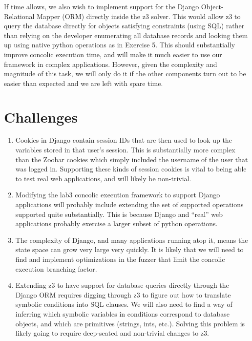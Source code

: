 \documentclass[a4page]{scrartcl}
\begin{document}
If time allows, we also wish to implement support for the Django
Object-Relational Mapper (ORM) directly inside the z3 solver. This would allow
z3 to query the database directly for objects satisfying constraints (using
SQL) rather than relying on the developer enumerating all database records and
looking them up using native python operations as in Exercise 5. This should
substantially improve concolic execution time, and will make it much easier to
use our framework in complex applications. However, given the complexity and
magnitude of this task, we will only do it if the other components turn out to
be easier than expected and we are left with spare time.

\section{Challenges}
\begin{enumerate}
	\item Cookies in Django contain session IDs that are then used to look
		up the variables stored in that user's session. This is
		substantially more complex than the Zoobar cookies which simply
		included the username of the user that was logged in.
		Supporting these kinds of session cookies is vital to being
		able to test real web applications, and will likely be
		non-trivial.
	\item Modifying the lab3 concolic execution framework to support Django
		applications will probably include extending the set of
		supported operations supported quite substantially. This is
		because Django and ``real'' web applications probably exercise
		a larger subset of python operations.
	\item The complexity of Django, and many applications running atop it,
		means the state space can grow very large very quickly. It is
		likely that we will need to find and implement optimizations in
		the fuzzer that limit the concolic execution branching factor.
	\item Extending z3 to have support for database queries directly
		through the Django ORM requires digging through z3 to figure
		out how to translate symbolic conditions into SQL clauses.
		We will also need to find a way of inferring which symbolic
		variables in conditions correspond to database objects, and
		which are primitives (strings, ints, etc.). Solving this
		problem is likely going to require deep-seated and non-trivial
		changes to z3.
\end{enumerate}
\end{document}

